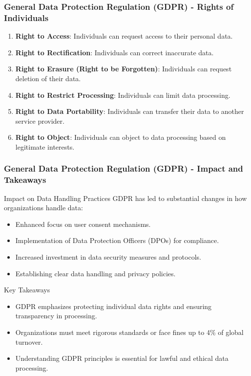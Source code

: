 \documentclass{beamer}
\begin{document}
\begin{frame}[fragile]
    \frametitle{General Data Protection Regulation (GDPR) - Rights of Individuals}
    \begin{enumerate}
        \item \textbf{Right to Access}: Individuals can request access to their personal data.
        \item \textbf{Right to Rectification}: Individuals can correct inaccurate data.
        \item \textbf{Right to Erasure (Right to be Forgotten)}: Individuals can request deletion of their data.
        \item \textbf{Right to Restrict Processing}: Individuals can limit data processing.
        \item \textbf{Right to Data Portability}: Individuals can transfer their data to another service provider.
        \item \textbf{Right to Object}: Individuals can object to data processing based on legitimate interests.
    \end{enumerate}
\end{frame}

\begin{frame}[fragile]
    \frametitle{General Data Protection Regulation (GDPR) - Impact and Takeaways}
    \begin{block}{Impact on Data Handling Practices}
        GDPR has led to substantial changes in how organizations handle data:
        \begin{itemize}
            \item Enhanced focus on user consent mechanisms.
            \item Implementation of Data Protection Officers (DPOs) for compliance.
            \item Increased investment in data security measures and protocols.
            \item Establishing clear data handling and privacy policies.
        \end{itemize}
    \end{block}

    \begin{block}{Key Takeaways}
        \begin{itemize}
            \item GDPR emphasizes protecting individual data rights and ensuring transparency in processing.
            \item Organizations must meet rigorous standards or face fines up to 4\% of global turnover.
            \item Understanding GDPR principles is essential for lawful and ethical data processing.
        \end{itemize}
    \end{block}
\end{frame}
\end{document}
